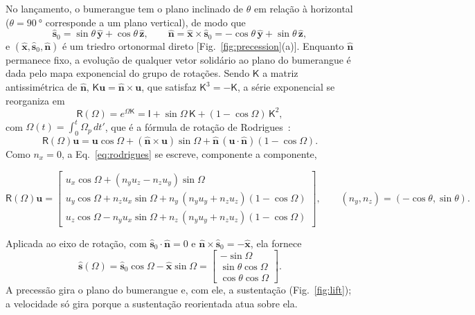 \documentclass[aps,pre,twocolumn,superscriptaddress,nofootinbib,floatfix]{revtex4-2}
\newcommand{\vect}[1]{\bm{#1}}
\newcommand{\uv}[1]{\hat{\bm{#1}}}
\begin{document}
No lançamento, o bumerangue tem o plano inclinado de $\theta$ em relação à horizontal ($\theta=\SI{90}{\degree}$ corresponde a um plano vertical), de modo que
\begin{equation}
  \uv s_0 = \sin\theta\,\uv y + \cos\theta\,\uv z,
  \qquad
  \uv n = \uv x\times\uv s_0 = -\cos\theta\,\uv y + \sin\theta\,\uv z ,
  \label{eq:axis}
\end{equation}
e $(\uv x,\uv s_0,\uv n)$ é um triedro ortonormal direto [Fig.~\ref{fig:precession}(a)]. Enquanto $\uv n$ permanece fixo, a evolução de qualquer vetor solidário ao plano do bumerangue é dada pelo mapa exponencial do grupo de rotações. Sendo $\mathsf K$ a matriz antissimétrica de $\uv n$, $\mathsf K\vect u=\uv n\times\vect u$, que satisfaz $\mathsf K^3=-\mathsf K$, a série exponencial se reorganiza em
\begin{equation}
  \mathsf R(\Omega) = e^{\Omega\mathsf K}
  = \mathsf{I} + \sin\Omega\,\mathsf K + (1-\cos\Omega)\,\mathsf K^2 ,
  \label{eq:expmap}
\end{equation}
com $\Omega(t)=\int_0^t\Omega_p\,dt'$, que é a fórmula de rotação de Rodrigues~\cite{goldstein2002}:
\begin{equation}
  \mathsf R(\Omega)\vect u = \vect u\cos\Omega + (\uv n\times\vect u)\sin\Omega + \uv n\,(\vect u\cdot\uv n)(1-\cos\Omega).
  \label{eq:rodrigues}
\end{equation}
Como $n_x=0$, a Eq.~\eqref{eq:rodrigues} se escreve, componente a componente,
\begin{widetext}
\begin{equation}
  \mathsf R(\Omega)\vect u =
  \begin{bmatrix}
    u_x\cos\Omega + (n_yu_z - n_zu_y)\sin\Omega \\
    u_y\cos\Omega + n_zu_x\sin\Omega + n_y\,(n_yu_y + n_zu_z)(1-\cos\Omega) \\
    u_z\cos\Omega - n_yu_x\sin\Omega + n_z\,(n_yu_y + n_zu_z)(1-\cos\Omega)
  \end{bmatrix},
  \qquad (n_y,n_z)=(-\cos\theta,\sin\theta).
  \label{eq:rodrigues_components}
\end{equation}
\end{widetext}
Aplicada ao eixo de rotação, com $\uv s_0\cdot\uv n=0$ e $\uv n\times\uv s_0=-\uv x$, ela fornece
\begin{equation}
  \uv s(\Omega) = \uv s_0\cos\Omega - \uv x\sin\Omega
  = \begin{bmatrix} -\sin\Omega \\ \sin\theta\cos\Omega \\ \cos\theta\cos\Omega \end{bmatrix}.
  \label{eq:s_of_Omega}
\end{equation}
A precessão gira o plano do bumerangue e, com ele, a sustentação (Fig.~\ref{fig:lift}); a velocidade só gira porque a sustentação reorientada atua sobre ela.
\end{document}
